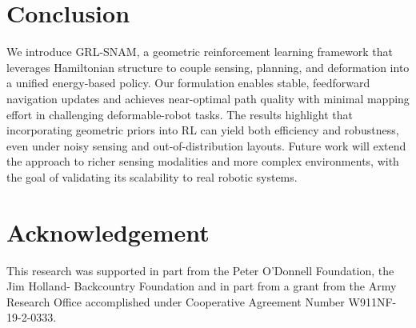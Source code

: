 \documentclass{article} %
\begin{document}





\section{Conclusion}
We introduce GRL-SNAM, a {geometric} reinforcement learning framework that leverages Hamiltonian structure to couple sensing, planning, and deformation into a unified energy-based policy. Our formulation enables stable, feedforward navigation updates and achieves near-optimal path quality with minimal mapping effort in challenging deformable-robot tasks. The results highlight that incorporating geometric priors into RL can yield both efficiency and robustness, even under noisy sensing and out-of-distribution layouts. Future work will extend the approach to richer sensing modalities and more complex environments, with the goal of validating its scalability to real robotic systems.

\section*{Acknowledgement}
This research was supported in part  from the Peter O’Donnell Foundation, the Jim Holland- Backcountry Foundation and in part from a grant from the Army Research Office accomplished under Cooperative Agreement Number W911NF-19-2-0333.
\newpage




\appendix

\end{document}
